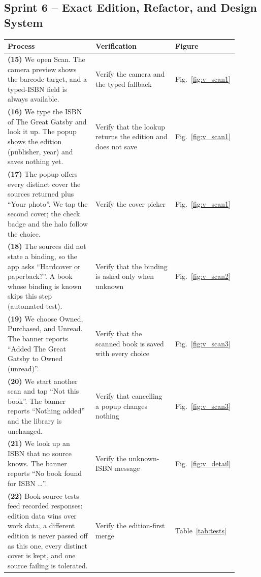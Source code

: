 \documentclass[12pt]{article}
\begin{document}
\subsection{Sprint 6 -- Exact Edition, Refactor, and Design System}

\begin{longtable}{L{0.4\linewidth} L{0.36\linewidth} L{0.14\linewidth}}
\toprule
\textbf{Process} & \textbf{Verification} & \textbf{Figure} \\
\midrule
\endhead
\textbf{(15)} We open Scan. The camera preview shows the barcode target, and a typed-ISBN field is always available. & Verify the camera and the typed fallback & Fig.~\ref{fig:v_scan1} \\
\textbf{(16)} We type the ISBN of The Great Gatsby and look it up. The popup shows the edition (publisher, year) and saves nothing yet. & Verify that the lookup returns the edition and does not save & Fig.~\ref{fig:v_scan1} \\
\textbf{(17)} The popup offers every distinct cover the sources returned plus ``Your photo''. We tap the second cover; the check badge and the halo follow the choice. & Verify the cover picker & Fig.~\ref{fig:v_scan1} \\
\textbf{(18)} The sources did not state a binding, so the app asks ``Hardcover or paperback?''. A book whose binding is known skips this step (automated test). & Verify that the binding is asked only when unknown & Fig.~\ref{fig:v_scan2} \\
\textbf{(19)} We choose Owned, Purchased, and Unread. The banner reports ``Added The Great Gatsby to Owned (unread)''. & Verify that the scanned book is saved with every choice & Fig.~\ref{fig:v_scan3} \\
\textbf{(20)} We start another scan and tap ``Not this book''. The banner reports ``Nothing added'' and the library is unchanged. & Verify that cancelling a popup changes nothing & Fig.~\ref{fig:v_scan3} \\
\textbf{(21)} We look up an ISBN that no source knows. The banner reports ``No book found for ISBN \ldots''. & Verify the unknown-ISBN message & Fig.~\ref{fig:v_detail} \\
\textbf{(22)} Book-source tests feed recorded responses: edition data wins over work data, a different edition is never passed off as this one, every distinct cover is kept, and one source failing is tolerated. & Verify the edition-first merge & Table~\ref{tab:tests} \\

\end{longtable}
\end{document}
